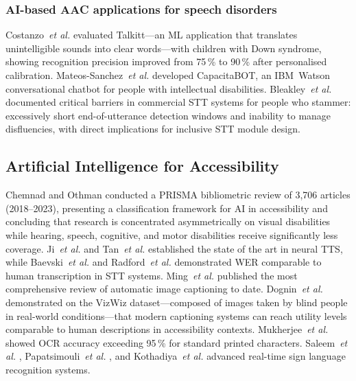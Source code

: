\documentclass[journal]{IEEEtran}
\begin{document}
	\subsubsection{AI-based AAC applications for speech disorders}
	Costanzo~\textit{et al.} \cite{costanzo2023} evaluated Talkitt---an
	ML application that translates unintelligible sounds into clear
	words---with children with Down syndrome, showing recognition
	precision improved from 75\,\% to 90\,\% after personalised
	calibration.
	Mateos-Sanchez~\textit{et al.} \cite{mateos2022} developed
	CapacitaBOT, an IBM~Watson conversational chatbot for people
	with intellectual disabilities.
	Bleakley~\textit{et al.} \cite{bleakley2022} documented critical
	barriers in commercial STT systems for people who stammer:
	excessively short end-of-utterance detection windows and inability
	to manage disfluencies, with direct implications for inclusive
	STT module design.
	
	\subsection{Artificial Intelligence for Accessibility}
	
	Chemnad and Othman \cite{chemnad2024} conducted a PRISMA
	bibliometric review of 3{,}706 articles (2018--2023), presenting
	a classification framework for AI in accessibility and concluding
	that research is concentrated asymmetrically on visual
	disabilities while hearing, speech, cognitive, and motor
	disabilities receive significantly less coverage.
	Ji~\textit{et al.} \cite{ji2024} and Tan~\textit{et al.}
	\cite{tan2021} established the state of the art in neural TTS,
	while Baevski~\textit{et al.} \cite{baevski2020} and
	Radford~\textit{et al.} \cite{radford2023} demonstrated
	WER comparable to human transcription in STT systems.
	Ming~\textit{et al.} \cite{ming2022} published the most
	comprehensive review of automatic image captioning to date.
	Dognin~\textit{et al.} \cite{dognin2021} demonstrated on the
	VizWiz dataset---composed of images taken by blind people in
	real-world conditions---that modern captioning systems can reach
	utility levels comparable to human descriptions in accessibility
	contexts.
	Mukherjee~\textit{et al.} \cite{mukherjee2023} showed OCR
	accuracy exceeding 95\,\% for standard printed characters.
	Saleem~\textit{et al.} \cite{saleem2023},
	Papatsimouli~\textit{et al.} \cite{papatsimouli2023}, and
	Kothadiya~\textit{et al.} \cite{kothadiya2022} advanced
	real-time sign language recognition systems.
	
\end{document}
